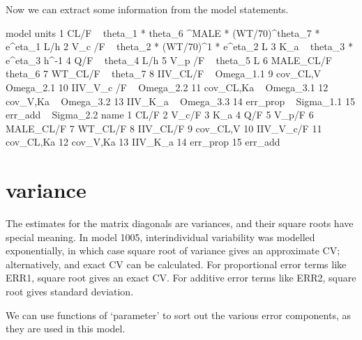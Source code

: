 Now we can extract some information from the model statements.
\begin{Schunk}
\begin{Soutput}
                                                           model units
1  CL/F  ~ theta_1 *  theta_6 ^MALE * (WT/70)^theta_7  * e^eta_1   L/h
2                        V_c /F  ~ theta_2 * (WT/70)^1 * e^eta_2     L
3                                       K_a  ~ theta_3 * e^eta_3 h^-1 
4                                                 Q/F  ~ theta_4   L/h
5                                              V_p /F  ~ theta_5     L
6                                            MALE_CL/F ~ theta_6      
7                                              WT_CL/F ~ theta_7      
8                                           IIV_CL/F ~ Omega_1.1      
9                                           cov_CL,V ~ Omega_2.1      
10                                        IIV_V_c /F ~ Omega_2.2      
11                                        cov_CL,Ka  ~ Omega_3.1      
12                                         cov_V,Ka  ~ Omega_3.2      
13                                          IIV_K_a  ~ Omega_3.3      
14                                          err_prop ~ Sigma_1.1      
15                                           err_add ~ Sigma_2.2      
        name
1       CL/F
2      V_c/F
3        K_a
4        Q/F
5      V_p/F
6  MALE_CL/F
7    WT_CL/F
8   IIV_CL/F
9   cov_CL,V
10 IIV_V_c/F
11 cov_CL,Ka
12  cov_V,Ka
13   IIV_K_a
14  err_prop
15   err_add
\end{Soutput}
\end{Schunk}
\section{variance}
The estimates for the matrix diagonals are variances, and their square roots have special meaning.  In model 1005, interindividual variability was modelled exponentially, in which case square root of variance gives an approximate CV; alternatively, and exact CV can be calculated.  For proportional error terms like ERR1, square root gives an exact CV.  For additive error terms like ERR2, square root gives standard deviation.

We can use functions of `parameter' to sort out the various error components, as they are used in this model. 
